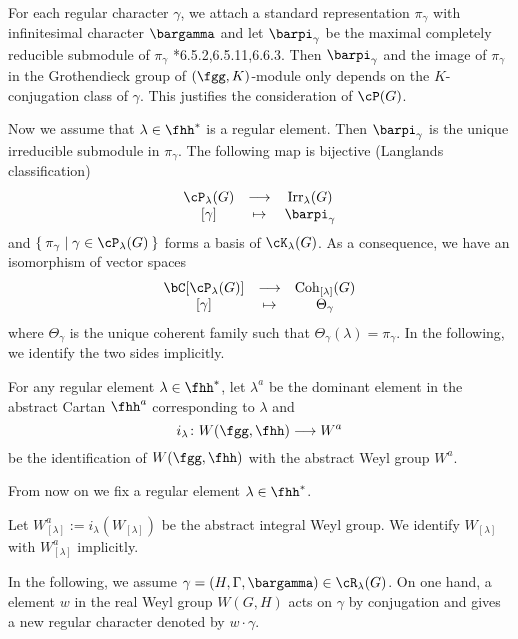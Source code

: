 \documentclass[counting_main.tex]{subfiles}
\begin{document}
For each regular character $\gamma$, we attach a standard representation
$\pi_\gamma$ with infinitesimal character $\bargamma$ and let $\barpi_\gamma$ be
the maximal completely reducible submodule of $\pi_\gamma$
\cite{Vg}*{6.5.2,6.5.11,6.6.3}. Then $\barpi_\gamma$ and the image of
$\pi_\gamma$ in the Grothendieck group of $(\fgg,K)$-module only depends on the
$K$-conjugation class of $\gamma$. This justifies the consideration of $\cP(G)$.


Now we assume that $\lambda\in \fhh^*$ is a regular element. Then
$\barpi_\gamma$ is the unique irreducible submodule in $\pi_\gamma$.
The following map is bijective (Langlands classification)
\[
  \begin{array}{ccc}
    \cP_{\lambda}(G) & \longrightarrow & \Irr_{\lambda}(G)\\
    {[\gamma]} & \mapsto & \barpi_{\gamma}
  \end{array}
\]
and $\Set{\pi_\gamma|\gamma\in \cP_{\lambda}(G)}$ forms a basis of
$\Grt_{\lambda}(G)$. As a consequence, we have an isomorphism of vector spaces
\[
  \begin{array}{ccc}
    \bC[\cP_{\lambda}(G)] & \longrightarrow & \Coh_{[\lambda]}(G)\\
    {[\gamma]} & \mapsto & \Theta_{\gamma}
  \end{array}
\]
where $\Theta_{\gamma}$ is the unique coherent family such that
$\Theta_{\gamma}(\lambda) = \pi_{\gamma}$.
In the following, we identify the two sides implicitly.

\medskip

\def\Wa{W^{a}}
\def\WiR{W_{i\bR}}
\def\fhhiR{\fhh_{i\bR}}
\def\WR{W_{\bR}}
\def\WC{W_{\bC}}
\def\lama{\lambda^{a}}
\def\Wlama{W^a_{[\lambda]}}
For any
regular element $\lambda\in \fhh^{*}$, let $\lambda^{a}$ be the dominant element
in the abstract Cartan $\fhh^{a}$ corresponding to $\lambda$ and
\[
  i_{\lambda}\colon W(\fgg,\fhh)\longrightarrow \Wa
\]
be the identification of $W(\fgg,\fhh)$ with the abstract Weyl group $\Wa$.

From now on we fix a regular element $\lambda \in \fhh^{*}$.

Let $\Wlama:= i_{\lambda}(W_{[\lambda]})$ be the abstract integral Weyl group.
We identify $W_{[\lambda]}$ with $\Wlama$ implicitly.

In the following, we
assume $\gamma=(H,\Gamma,\bargamma)\in \cR_{\lambda}(G)$. On one hand, a element
$w$ in the real Weyl group $W(G,H)$ acts on $\gamma$ by conjugation and gives a
new regular character denoted by $w\cdot \gamma$. 
\end{document}
